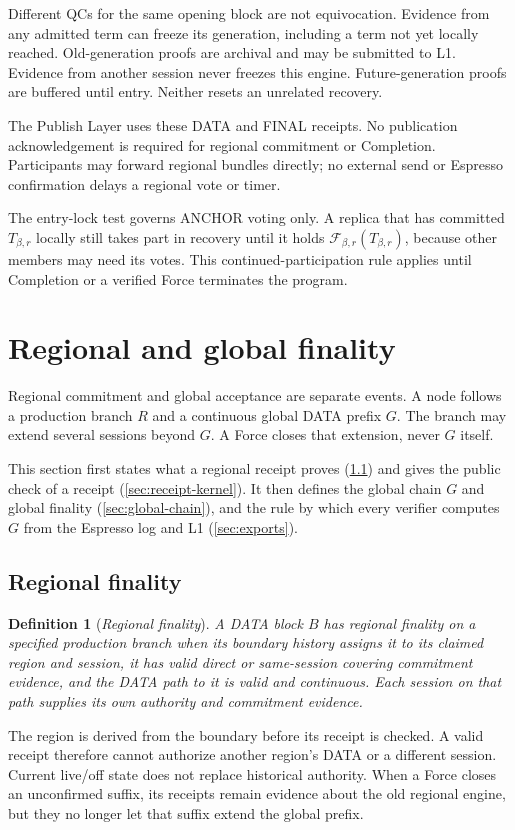 \documentclass[11pt,a4paper]{article}
\newcommand{\RR}[1]{{\color{rrRed}#1}}
\newcommand{\FC}{\mathcal F}
\newcommand{\defterm}[1]{\textcolor{rrBlue}{\textit{#1}}}
\newtheorem{definition}{Definition}[section]
\begin{document}
Different QCs for the same opening block are not equivocation. Evidence
from any admitted term can freeze its generation, including a term not
yet locally reached. Old-generation proofs are archival and may be
submitted to L1. \RR{Evidence from another session never freezes this
engine.} Future-generation proofs are buffered until entry. Neither
resets an unrelated recovery.

The Publish Layer uses these DATA and FINAL receipts. No publication
acknowledgement is required for regional commitment or Completion.
Participants may forward regional bundles directly; no external send
or Espresso confirmation delays a regional vote or timer.

The entry-lock test governs ANCHOR voting only. A replica that has
committed $T_{\beta,r}$ locally still takes part in recovery until it holds
$\FC_{\beta,r}(T_{\beta,r})$, because other members may need its votes. This continued-participation
rule applies until Completion or a verified Force terminates the program.

\section{Regional and global finality}
\label{sec:external}
Regional commitment and global acceptance are separate events. A node
follows a production branch $R$ and a continuous global DATA prefix
$G$. The branch may extend several sessions beyond $G$. A Force
closes that extension, never $G$ itself.

This section first states what a regional receipt proves
(\cref{sec:regional-finality}) and gives the public check of a receipt
(\cref{sec:receipt-kernel}). It then defines the global chain $G$ and
global finality (\cref{sec:global-chain}), and the rule by which every
verifier computes $G$ from the Espresso log and L1
(\cref{sec:exports}).

\subsection{Regional finality}
\label{sec:regional-finality}
\begin{definition}[\defterm{Regional finality}]
\label{def:regional-finality}
A DATA block $B$ has regional finality on a specified production branch
when its boundary history assigns it to its claimed region and session,
it has valid direct or same-session covering commitment evidence, and
the DATA path to it is valid and continuous. Each session on that path
supplies its own authority and commitment evidence.
\end{definition}
The region is derived from the boundary before its receipt is checked.
A valid receipt therefore cannot authorize another region's DATA or a
different session. Current live/off state does not replace historical
authority. When a Force closes an unconfirmed suffix, its receipts remain
evidence about the old regional engine, but they no longer let that
suffix extend the global prefix.
\end{document}
